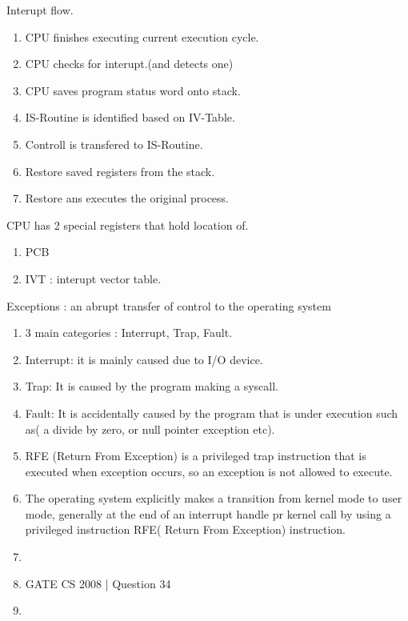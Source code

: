 \begin{enumerate}
  \begin{minipage}{\linewidth}
  \item Interupt flow.
  \begin{enumerate}
        \item CPU finishes executing current execution cycle.
        \item CPU checks for interupt.(and detects one)
        \item CPU saves program status word onto stack.
        \item IS-Routine is identified based on IV-Table.
        \item Controll is transfered to IS-Routine.
        \item Restore saved registers from the stack.
        \item Restore ans executes the original process.
  \end{enumerate}
  \end{minipage} \vspace{0.08in}

  \item CPU has 2 special registers that hold location of.
  \begin{enumerate}
        \item PCB
        \item IVT : interupt vector table.
  \end{enumerate}

  \item Exceptions : an abrupt transfer of control to the operating system
  \begin{enumerate}
      \item 3 main categories :  Interrupt, Trap, Fault.
      \item Interrupt: it is mainly caused due to I/O device.
      \item Trap: It is caused by the program making a syscall.
      \item Fault: It is accidentally caused by the program that is under execution such as( a divide by zero,
            or null pointer exception etc).
      \item RFE (Return From Exception) is a privileged trap instruction that is executed when exception occurs,
            so an exception is not allowed to execute.
      \item  The operating system explicitly makes a transition from kernel mode to user mode, generally at
             the end of an interrupt handle pr kernel call by using a privileged instruction
             RFE( Return From Exception) instruction.
      \item {}
      \item GATE CS 2008 | Question 34
      \item {}
  \end{enumerate}



\end{enumerate}

